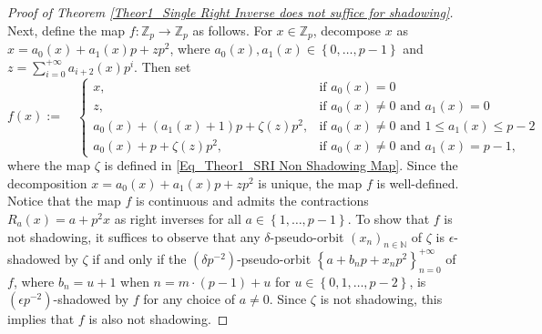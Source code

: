 \documentclass[a4paper, 12pt]{article}
\theoremstyle{definition}
\begin{document}
\begin{proof}[Proof of Theorem \ref{Theor1_Single Right Inverse does not suffice for shadowing}]
		Next, define the map $f: \mathbb{Z}_{p} \to \mathbb{Z}_{p}$ as follows. For $x \in \mathbb{Z}_{p}$, decompose $x$ as $x = a_{0} \left(  x  \right)  + a_{1} \left(  x  \right)  p + z p^{2}$, where $ a_{0} \left(  x  \right) , a_{1} \left(  x  \right)  \in  \left\{  0, \dots, p-1  \right\} $ and $z =  \sum_{i=0}^{+ \infty } a_{i+2} \left(  x  \right)  p^{i}$. Then set 
		$$ f(x)  := \quad \begin{cases}
			x , & \text{if } a_{0} \left(  x  \right)  = 0   \\ 
			z, & \text{if } a_{0} \left(  x  \right)  \neq 0 \text{ and } a_{1} \left(  x  \right)  = 0   \\ 
			a_{0} \left(  x  \right)  +  \left(  a_{1} \left(  x  \right)  + 1  \right)  p +  \zeta(z) p^{2} , & \text{if } a_{0} \left(  x  \right)   \neq 0 \text{ and } 1\le a_{1} \left(  x  \right)  \le p-2   \\ 
			a_{0} \left(  x  \right)  + p +  \zeta(z) p^{2}, & \text{if } a_{0} \left(  x  \right)  \neq 0 \text{ and } a_{1} \left(  x  \right)  = p-1 ,
		\end{cases}      
		$$
		where the map $\zeta$ is defined in \eqref{Eq_Theor1_SRI Non Shadowing Map}. 
		Since the decomposition $x = a_{0} \left(  x  \right)  + a_{1} \left(  x  \right)  p +  zp^{2} $ is unique, the map $f$ is well-defined. Notice that the map $f$ is continuous and admits the contractions $R_{a}(x) = a +  p^{2} x$ as right inverses for all $a \in  \left\{   1, \dots, p-1  \right\} $. 
		To show that $f$ is not shadowing, it suffices to observe that any $\delta$-pseudo-orbit $ \left(  x_{n}   \right)_{n \in  \mathbb{N} }$ of $\zeta$ is $ \epsilon $-shadowed by $\zeta$ if and only if the $ \left(  \delta p^{-2}  \right) $-pseudo-orbit $ \left\{  a + b_{n}p + x_{n} p^{2}  \right\}_{n=0}^{+ \infty }$ of $f$, where $b_{n} = u +1$ when $n = m \cdot (p-1) + u$ for $u \in  \left\{  0,1, \dots, p-2  \right\} $, is $ \left(   \epsilon p^{-2}  \right) $-shadowed by $f$ for any choice of $a \neq 0$. 
		Since $\zeta$ is not shadowing, this implies that $f$ is also not shadowing. 
		

\end{proof}
\end{document}
